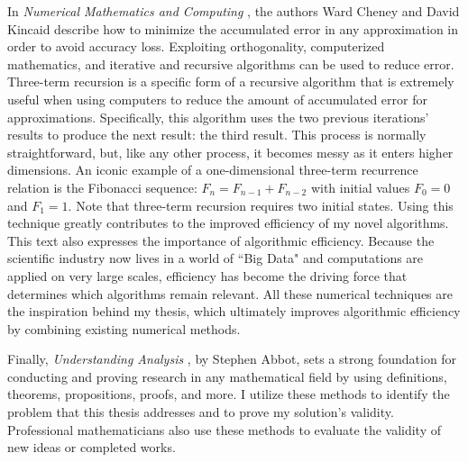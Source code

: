 \documentclass[letterpaper, 12pt]{article}
\begin{document}
In \textit{Numerical Mathematics and Computing} \cite{chk}, the authors Ward Cheney and David Kincaid describe how to minimize the accumulated error in any approximation in order to avoid accuracy loss. Exploiting orthogonality, computerized mathematics, and iterative and recursive algorithms can be used to reduce error. Three-term recursion is a specific form of a recursive algorithm that is extremely useful when using computers to reduce the amount of accumulated error for approximations. Specifically, this algorithm uses the two previous iterations' results to produce the next result: the third result. This process is normally straightforward, but, like any other process, it becomes messy as it enters higher dimensions. An iconic example of a one-dimensional three-term recurrence relation is the Fibonacci sequence: $F_n = F_{n-1} + F_{n-2}$ with initial values $F_0 = 0$ and $F_1 = 1$. Note that three-term recursion requires two initial states. Using this technique greatly contributes to the improved efficiency of my novel algorithms. This text also expresses the importance of algorithmic efficiency. Because the scientific industry now lives in a world of ``Big Data" and computations are applied on very large scales, efficiency has become the driving force that determines which algorithms remain relevant. All these numerical techniques are the inspiration behind my thesis, which ultimately improves algorithmic efficiency by combining existing numerical methods. 

Finally, \textit{Understanding Analysis} \cite{abb}, by Stephen Abbot, sets a strong foundation for conducting and proving research in any mathematical field by using definitions, theorems, propositions, proofs, and more. I utilize these methods to identify the problem that this thesis addresses and to prove my solution's validity. Professional mathematicians also use these methods to evaluate the validity of new ideas or completed works.
\end{document}
